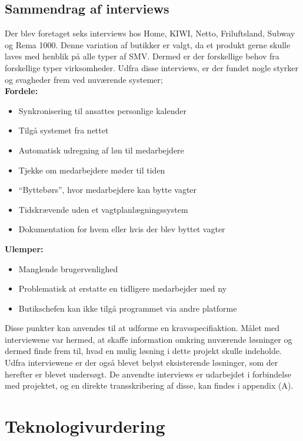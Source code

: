 \subsection{Sammendrag af interviews}
Der blev foretaget seks interviews hos Home, KIWI, Netto, Friluftsland, Subway og Rema 1000. Denne variation af butikker er valgt, da et produkt gerne skulle laves med henblik på alle typer af SMV. Dermed er der forskellige behov fra forskellige typer virksomheder. Udfra disse interviews, er der fundet nogle styrker og svagheder frem ved nuværende systemer;\\

\textbf{Fordele:}
\begin{itemize}
\setlength\itemsep{0.3em}
\item Synkronisering til ansattes personlige kalender
\item Tilgå systemet fra nettet
\item Automatisk udregning af løn til medarbejdere
\item Tjekke om medarbejdere møder til tiden
\item “Byttebørs”, hvor medarbejdere kan bytte vagter
\item Tidskrævende uden et vagtplanlægningssystem
\item Dokumentation for hvem eller hvis der blev byttet vagter\\
\end{itemize}

\textbf{Ulemper:}
\begin{itemize}
\item Manglende brugervenlighed
\item Problematisk at erstatte en tidligere medarbejder med ny
\item Butikschefen kan ikke tilgå programmet via andre platforme
\end{itemize}

Disse punkter kan anvendes til at udforme en kravsspecifiaktion. Målet med interviewene var hermed, at skaffe information omkring nuværende løsninger og dermed finde frem til, hvad en mulig løsning i dette projekt skulle indeholde. Udfra interviewene er der også blevet belyst eksisterende løsninger, som der herefter er blevet undersøgt.
De anvendte interviews er udarbejdet i forbindelse med projektet, og en direkte transskribering af disse, kan findes i appendix (A).

\section{Teknologivurdering}

